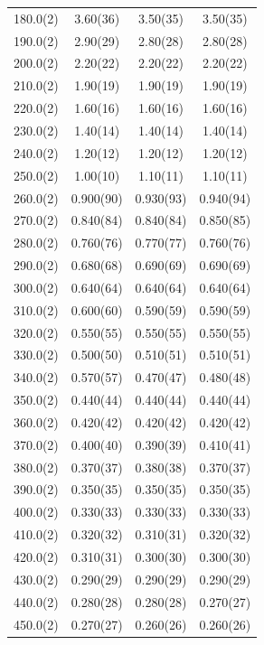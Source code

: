 \begin{longtable}{S[table-format=3.1(1)] S[table-format=3.3(3)] S[table-format=3.3(3)] S[table-format=3.3(3)]}
        180.0(2) & 3.60(36) & 3.50(35) & 3.50(35)\\ 
        190.0(2) & 2.90(29) & 2.80(28) & 2.80(28)\\ 
        200.0(2) & 2.20(22) & 2.20(22) & 2.20(22)\\ 
        210.0(2) & 1.90(19) & 1.90(19) & 1.90(19)\\ 
        220.0(2) & 1.60(16) & 1.60(16) & 1.60(16)\\ 
        230.0(2) & 1.40(14) & 1.40(14) & 1.40(14)\\ 
        240.0(2) & 1.20(12) & 1.20(12) & 1.20(12)\\ 
        250.0(2) & 1.00(10) & 1.10(11) & 1.10(11)\\ 
        260.0(2) & 0.900(90) & 0.930(93) & 0.940(94)\\ 
        270.0(2) & 0.840(84) & 0.840(84) & 0.850(85)\\ 
        280.0(2) & 0.760(76) & 0.770(77) & 0.760(76)\\ 
        290.0(2) & 0.680(68) & 0.690(69) & 0.690(69)\\ 
        300.0(2) & 0.640(64) & 0.640(64) & 0.640(64)\\ 
        310.0(2) & 0.600(60) & 0.590(59) & 0.590(59)\\ 
        320.0(2) & 0.550(55) & 0.550(55) & 0.550(55)\\ 
        330.0(2) & 0.500(50) & 0.510(51) & 0.510(51)\\ 
        340.0(2) & 0.570(57) & 0.470(47) & 0.480(48)\\ 
        350.0(2) & 0.440(44) & 0.440(44) & 0.440(44)\\ 
        360.0(2) & 0.420(42) & 0.420(42) & 0.420(42)\\ 
        370.0(2) & 0.400(40) & 0.390(39) & 0.410(41)\\ 
        380.0(2) & 0.370(37) & 0.380(38) & 0.370(37)\\ 
        390.0(2) & 0.350(35) & 0.350(35) & 0.350(35)\\ 
        400.0(2) & 0.330(33) & 0.330(33) & 0.330(33)\\ 
        410.0(2) & 0.320(32) & 0.310(31) & 0.320(32)\\ 
        420.0(2) & 0.310(31) & 0.300(30) & 0.300(30)\\ 
        430.0(2) & 0.290(29) & 0.290(29) & 0.290(29)\\ 
        440.0(2) & 0.280(28) & 0.280(28) & 0.270(27)\\ 
        450.0(2) & 0.270(27) & 0.260(26) & 0.260(26)\\ 

\end{longtable}
